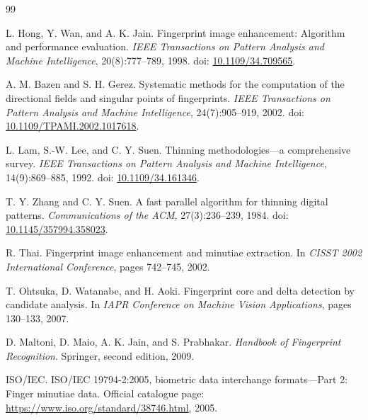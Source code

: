 \documentclass[11pt]{article}
\begin{document}
\begin{thebibliography}{99}

L. Hong, Y. Wan, and A. K. Jain.
\newblock Fingerprint image enhancement: Algorithm and performance evaluation.
\newblock \emph{IEEE Transactions on Pattern Analysis and Machine Intelligence}, 20(8):777--789, 1998.
\newblock doi: \href{https://doi.org/10.1109/34.709565}{10.1109/34.709565}.

A. M. Bazen and S. H. Gerez.
\newblock Systematic methods for the computation of the directional fields and singular points of fingerprints.
\newblock \emph{IEEE Transactions on Pattern Analysis and Machine Intelligence}, 24(7):905--919, 2002.
\newblock doi: \href{https://doi.org/10.1109/TPAMI.2002.1017618}{10.1109/TPAMI.2002.1017618}.

L. Lam, S.-W. Lee, and C. Y. Suen.
\newblock Thinning methodologies---a comprehensive survey.
\newblock \emph{IEEE Transactions on Pattern Analysis and Machine Intelligence}, 14(9):869--885, 1992.
\newblock doi: \href{https://doi.org/10.1109/34.161346}{10.1109/34.161346}.

T. Y. Zhang and C. Y. Suen.
\newblock A fast parallel algorithm for thinning digital patterns.
\newblock \emph{Communications of the ACM}, 27(3):236--239, 1984.
\newblock doi: \href{https://doi.org/10.1145/357994.358023}{10.1145/357994.358023}.

R. Thai.
\newblock Fingerprint image enhancement and minutiae extraction.
\newblock In \emph{CISST 2002 International Conference}, pages 742--745, 2002.

T. Ohtsuka, D. Watanabe, and H. Aoki.
\newblock Fingerprint core and delta detection by candidate analysis.
\newblock In \emph{IAPR Conference on Machine Vision Applications}, pages 130--133, 2007.

D. Maltoni, D. Maio, A. K. Jain, and S. Prabhakar.
\newblock \emph{Handbook of Fingerprint Recognition}.
\newblock Springer, second edition, 2009.

ISO/IEC.
\newblock ISO/IEC 19794-2:2005, biometric data interchange formats---Part 2: Finger minutiae data.
\newblock Official catalogue page: \url{https://www.iso.org/standard/38746.html}, 2005.


\end{thebibliography}
\end{document}
